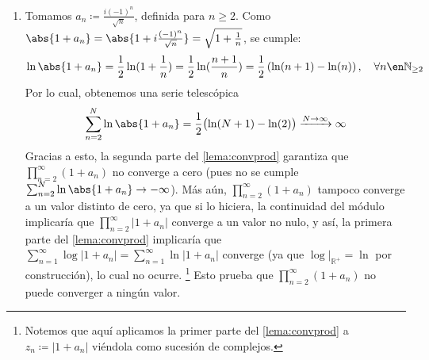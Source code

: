 \begin{sol}
\begin{enumerate}[label=(\alph*), leftmargin=1.5em]
\footnote{
    En efecto, pues para cualesquiera dos sucesiones $\set{a_n}^\infty_{n=1}$ y $\set{b_n}^\infty_{n=1}$ de números complejos, basta con que $\sum^\infty_{n=1}(a_n-b_n)$ converja para garantizar (gracias a la linealidad) que, si $\sum^\infty_{n=1} a_n$ converge entonces también lo hace $\sum^\infty_{n=1}b_n =\sum^\infty_{n=1}a_n-\sum^\infty_{n=1}(a_n-b_n)$, y si $\sum^\infty_{n=1}b_n$ converge entonces también lo hace $\sum^\infty_{n=1}a_n = \sum^\infty_{n=1}(a_n-b_n) + \sum^\infty_{n=1}b_n$. 
}
sin embargo, gracias al \cref{lema:convprod}, sabemos que esta última serie converge si y solo si $\prod^\infty_{n=1}(1+a_n)$ converge a un valor no nulo. Más aún, como ninguno de los términos $|a_n| > \nicefrac{1}{2}$ obviados al inicio de la sucesión son iguales a $-1$ (y así $(1+a_n) \neq 0$), podemos asegurar que, al momento de considerarlos, el producto total seguirá siendo no nulo. Esto concluye la prueba
\item %
Tomamos $a_n \coloneq \frac{i(-1)^n}{\sqrt{n}}$, definida para $n\ge 2$. Como $\abs{1+a_n} = \abs{1+i\frac{(-1)^n}{\sqrt{n}}} = \sqrt{1+\frac{1}{n}}$, se cumple:
\[
\ln{\abs{1+a_n}} 
= \frac{1}{2} \ln(1+\frac{1}{n})
= \frac{1}{2} \ln(\frac{n+1}{n}) = \frac{1}{2}\left(\ln(n+1) - \ln(n)\right),
\quad\forall n \en \mathbb{N}_{\ge2}
\]
Por lo cual, obtenemos una serie telescópica
\[
\sum^N_{n=2}\ln\abs{1+a_n}
= \frac{1}{2}\bigl( \ln(N+1) - \ln({2}) \bigr)
\xrightarrow{N\to\infty} \infty
\]
Gracias a esto, la segunda parte del \cref{lema:convprod} garantiza que $\prod^\infty_{n=2}(1+a_n)$ no converge a cero (pues no se cumple $\sum^N_{n=2}\ln\abs{1+a_n} \to-\infty$). Más aún, $\prod^\infty_{n=2}(1+a_n)$ tampoco converge a un valor distinto de cero, ya que si lo hiciera, la continuidad del módulo implicaría que $\prod^\infty_{n=2}|1+a_n|$ converge a un valor no nulo, y así, la primera parte del \cref{lema:convprod} implicaría que $\sum^\infty_{n=1}\log|1+a_n|=\sum^\infty_{n=1}\ln|1+a_n|$ converge (ya que $\log|_{\mathbb{R}^+} = \ln$ por construcción), lo cual no ocurre.%
\footnote{
    Notemos que aquí aplicamos la primer parte del \cref{lema:convprod} a $z_n \coloneq |1+a_n|$ viéndola como sucesión de complejos.
}
Esto prueba que $\prod^\infty_{n=2}(1+a_n)$ no puede converger a ningún valor.
\par

\end{enumerate}
\end{sol}
